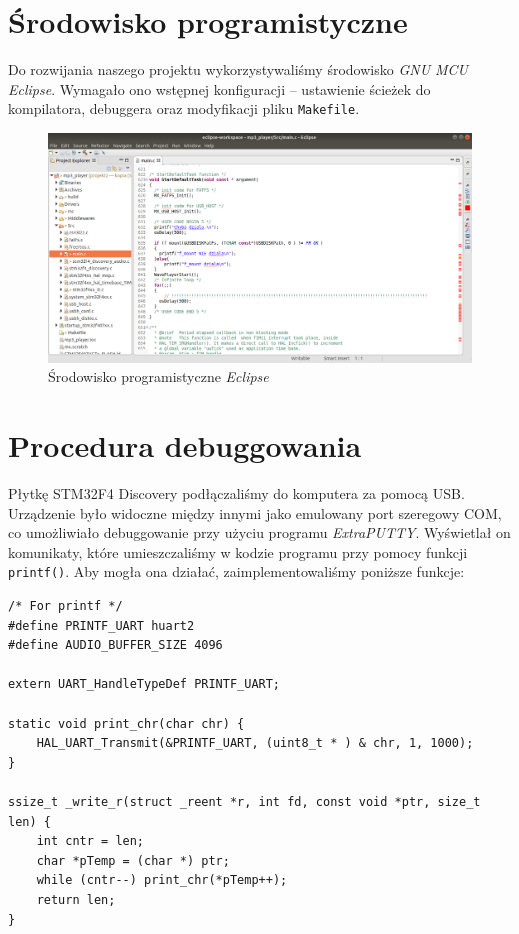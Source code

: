 \documentclass[12pt,a4paper]{article}
\begin{document}
\section{Środowisko programistyczne}
Do rozwijania naszego projektu wykorzystywaliśmy środowisko \emph{GNU MCU Eclipse}. Wymagało ono wstępnej konfiguracji -- ustawienie ścieżek do kompilatora, debuggera oraz modyfikacji pliku \texttt{Makefile}.

\begin{figure}[H]
 \centerline{\includegraphics[width=\textwidth]{img/img6}}
 \caption{Środowisko programistyczne \emph{Eclipse}}
 \label{img6}
\end{figure}

\section{Procedura debuggowania}
Płytkę STM32F4 Discovery podłączaliśmy do komputera za pomocą USB. Urządzenie było widoczne między innymi jako emulowany port szeregowy COM, co umożliwiało debuggowanie przy użyciu programu \emph{ExtraPUTTY}. Wyświetlał on komunikaty, które umieszczaliśmy w kodzie programu przy pomocy funkcji \texttt{printf()}. Aby mogła ona działać, zaimplementowaliśmy poniższe funkcje:

\begin{lstlisting}
/* For printf */
#define PRINTF_UART huart2
#define AUDIO_BUFFER_SIZE 4096

extern UART_HandleTypeDef PRINTF_UART;

static void print_chr(char chr) {
    HAL_UART_Transmit(&PRINTF_UART, (uint8_t * ) & chr, 1, 1000);
}

ssize_t _write_r(struct _reent *r, int fd, const void *ptr, size_t len) {
    int cntr = len;
    char *pTemp = (char *) ptr;
    while (cntr--) print_chr(*pTemp++);
    return len;
}
\end{lstlisting}
\end{document}
